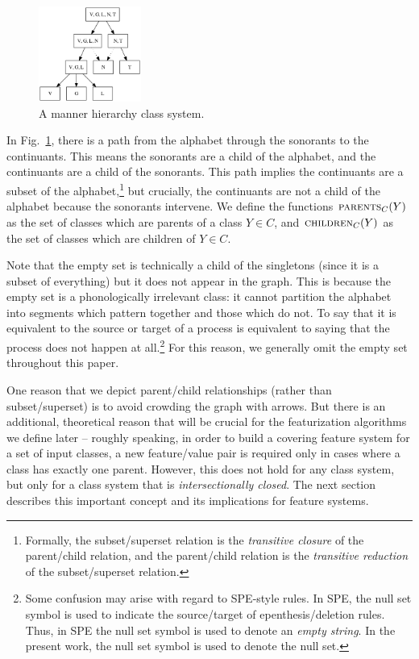 \documentclass[12pt, oneside]{article}   	%
\begin{document}
\begin{figure}[htb!]
	\centering
	\includegraphics[width=0.3\textwidth]{manner_poset_privative.png}
	\caption{A manner hierarchy class system.}
	\label{fig:manner_input}
\end{figure}

In Fig.~\ref{fig:manner_input}, there is a path from the alphabet through the sonorants to the continuants. This means the sonorants are a child of the alphabet, and the continuants are a child of the sonorants. This path implies the continuants are a subset of the alphabet,\footnote{Formally, the subset/superset relation is the \textit{transitive closure} of the parent/child relation, and the parent/child relation is the \textit{transitive reduction} of the subset/superset relation.} but crucially, the continuants are not a child of the alphabet because the sonorants intervene. We  define the functions $\textsc{parents}_C(Y)$ as the set of classes which are parents of a class $Y \in C$, and $\textsc{children}_C(Y)$ as the set of classes which are children of $Y \in C$.

Note that the empty set is technically a child of the singletons (since it is a subset of everything) but it does not appear in the graph. This is because the empty set is a phonologically irrelevant class: it cannot partition the alphabet into segments which pattern together and those which do not. To say that it is equivalent to the source or target of a process is equivalent to saying that the process does not happen at all.\footnote{Some confusion may arise with regard to SPE-style rules. In SPE, the null set symbol is used to indicate the source/target of epenthesis/deletion rules. Thus, in SPE the null set symbol is used to denote an \emph{empty string}. In the present work, the null set symbol is used to denote the null set.} For this reason, we generally omit the empty set throughout this paper.

One reason that we depict parent/child relationships (rather than subset/superset) is to avoid crowding the graph with arrows. But there is an additional, theoretical reason that will be crucial for the featurization algorithms we define later -- roughly speaking, in order to build a covering feature system for a set of input classes, a new feature/value pair is required only in cases where a class has exactly one parent. However, this does not hold for any class system, but only for a class system that is \textit{intersectionally closed}. The next section describes this important concept and its implications for feature systems.
\end{document}
